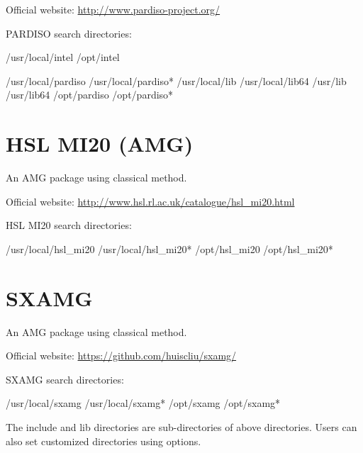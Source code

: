\documentclass[12pt]{book}
\begin{document}
Official website: \url{http://www.pardiso-project.org/}

PARDISO search directories:
\begin{evb}
/usr/local/intel
/opt/intel

/usr/local/pardiso
/usr/local/pardiso*
/usr/local/lib
/usr/local/lib64 
/usr/lib
/usr/lib64
/opt/pardiso
/opt/pardiso*
\end{evb}

\section{HSL MI20 (AMG)}
An AMG package using classical method. 

Official website: \url{http://www.hsl.rl.ac.uk/catalogue/hsl_mi20.html}

HSL MI20 search directories:
\begin{evb}
/usr/local/hsl_mi20
/usr/local/hsl_mi20*
/opt/hsl_mi20
/opt/hsl_mi20*
\end{evb}

\section{SXAMG}
An AMG package using classical method. 

Official website: \url{https://github.com/huiscliu/sxamg/}

SXAMG search directories:
\begin{evb}
/usr/local/sxamg
/usr/local/sxamg*
/opt/sxamg
/opt/sxamg*
\end{evb}

The include and lib directories are sub-directories of above directories. Users can also set customized directories using options.
\end{document}
